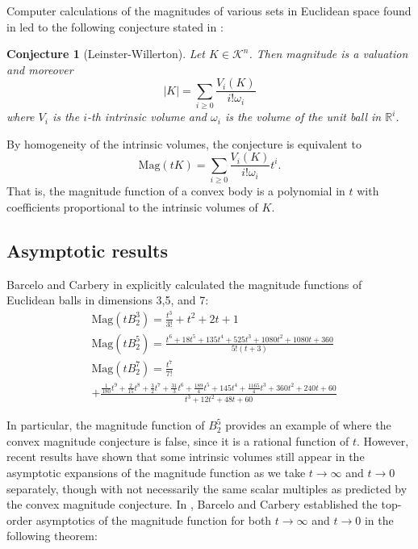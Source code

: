 \documentclass[11pt]{article}
\theoremstyle{mythm}
\newtheorem*{conj}{Conjecture}
\begin{document}
Computer calculations of the magnitudes of various sets in Euclidean space found in \cite{willerton_heuristic_2009} led to the following conjecture stated in \cite{leinster_asymptotic_2013}:

\begin{conj}[Leinster-Willerton]
Let $K\in\mathcal{K}^n$. Then magnitude is a valuation and moreover
\begin{equation*}
\vert K \vert = \sum\limits_{i\geq0}\frac{V_i(K)}{i!\omega_i}
\end{equation*}
where $V_i$ is the $i$-th intrinsic volume and $\omega_i$ is the volume of the unit ball in $\mathbb{R}^i$.
\end{conj}

By homogeneity of the intrinsic volumes, the conjecture is equivalent to
\begin{equation*}
\text{Mag}(tK) = \sum\limits_{i\geq0}\frac{V_i(K)}{i!\omega_i}t^i.
\end{equation*}
That is, the magnitude function of a convex body is a polynomial in $t$ with coefficients proportional to the intrinsic volumes of $K$.

\subsection{Asymptotic results}

Barcelo and Carbery in \cite{barcelo_magnitudes_2016} explicitly calculated the magnitude functions of Euclidean balls in dimensions 3,5, and 7:
\begin{equation}\label{eqn:explicitmagfuns}
\begin{aligned}
&\text{Mag}(tB_2^3) = \frac{t^3}{3!}+t^2+2t+1 \\
&\text{Mag}(tB_2^5) = \frac{t^6+18t^5+135t^4+525t^3+1080t^2+1080t+360}{5!(t+3)} \\
&\text{Mag}(tB_2^7) = \frac{t^7}{7!} \\
&+ \frac{\frac{1}{180}t^9+\frac{2}{15}t^8+\frac{3}{2}t^7+\frac{31}{3}t^6+\frac{189}{4}t^5+145t^4+\frac{1165}{4}t^3+360t^2+240t+60}{t^3+12t^2+48t+60}
\end{aligned}
\end{equation}

In particular, the magnitude function of $B_2^5$ provides an example of where the convex magnitude conjecture is false, since it is a rational function of $t$. However, recent results have shown that some intrinsic volumes still appear in the asymptotic expansions of the magnitude function as we take $t \to \infty$ and $t \to 0$ separately, though with not necessarily the same scalar multiples as predicted by the convex magnitude conjecture. In \cite{barcelo_magnitudes_2016}, Barcelo and Carbery established the top-order asymptotics of the magnitude function for both $t\to\infty$ and $t\to0$ in the following theorem:
\end{document}
